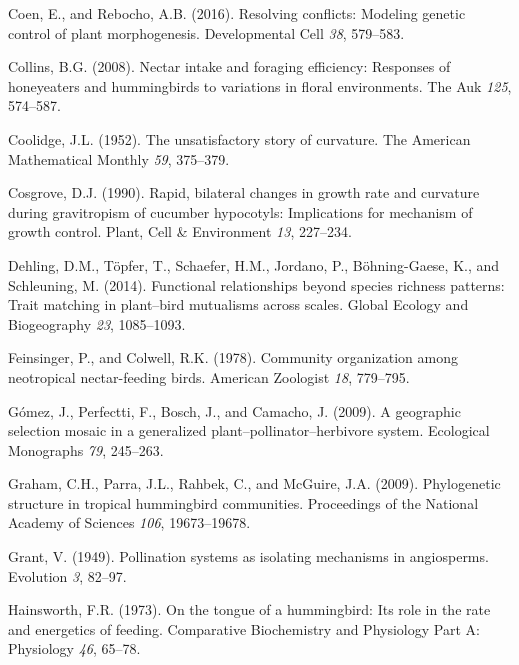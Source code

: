 \documentclass[]{article}
\begin{document}
\leavevmode\hypertarget{ref-coen_2016}{}%
Coen, E., and Rebocho, A.B. (2016). Resolving conflicts: Modeling
genetic control of plant morphogenesis. Developmental Cell \emph{38},
579--583.

\leavevmode\hypertarget{ref-collins_2008}{}%
Collins, B.G. (2008). Nectar intake and foraging efficiency: Responses
of honeyeaters and hummingbirds to variations in floral environments.
The Auk \emph{125}, 574--587.

\leavevmode\hypertarget{ref-coolidge_1952}{}%
Coolidge, J.L. (1952). The unsatisfactory story of curvature. The
American Mathematical Monthly \emph{59}, 375--379.

\leavevmode\hypertarget{ref-cosgrove_1990}{}%
Cosgrove, D.J. (1990). Rapid, bilateral changes in growth rate and
curvature during gravitropism of cucumber hypocotyls: Implications for
mechanism of growth control. Plant, Cell \& Environment \emph{13},
227--234.

\leavevmode\hypertarget{ref-dehling_2014}{}%
Dehling, D.M., Töpfer, T., Schaefer, H.M., Jordano, P., Böhning-Gaese,
K., and Schleuning, M. (2014). Functional relationships beyond species
richness patterns: Trait matching in plant--bird mutualisms across
scales. Global Ecology and Biogeography \emph{23}, 1085--1093.

\leavevmode\hypertarget{ref-feinsinger_1978}{}%
Feinsinger, P., and Colwell, R.K. (1978). Community organization among
neotropical nectar-feeding birds. American Zoologist \emph{18},
779--795.

\leavevmode\hypertarget{ref-gomez_2009}{}%
Gómez, J., Perfectti, F., Bosch, J., and Camacho, J. (2009). A
geographic selection mosaic in a generalized
plant--pollinator--herbivore system. Ecological Monographs \emph{79},
245--263.

\leavevmode\hypertarget{ref-graham_2009}{}%
Graham, C.H., Parra, J.L., Rahbek, C., and McGuire, J.A. (2009).
Phylogenetic structure in tropical hummingbird communities. Proceedings
of the National Academy of Sciences \emph{106}, 19673--19678.

\leavevmode\hypertarget{ref-grant_1949}{}%
Grant, V. (1949). Pollination systems as isolating mechanisms in
angiosperms. Evolution \emph{3}, 82--97.

\leavevmode\hypertarget{ref-hainsworth_1973}{}%
Hainsworth, F.R. (1973). On the tongue of a hummingbird: Its role in the
rate and energetics of feeding. Comparative Biochemistry and Physiology
Part A: Physiology \emph{46}, 65--78.
\end{document}
